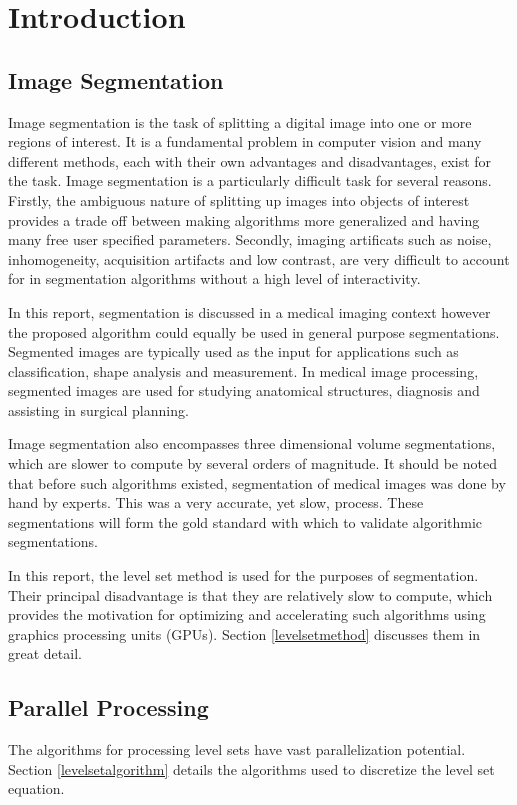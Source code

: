 \chapter{Introduction}

\section{Image Segmentation}
Image segmentation is the task of splitting a digital image into one or more regions of interest. It is a fundamental problem in computer vision and many different methods, each with their own advantages and disadvantages, exist for the task. Image segmentation is a particularly difficult task for several reasons. Firstly, the ambiguous nature of splitting up images into objects of interest provides a trade off between making algorithms more generalized and having many free user specified parameters. Secondly, imaging artificats such as noise, inhomogeneity, acquisition artifacts and low contrast, are very difficult to account for in segmentation algorithms without a high level of interactivity. 

In this report, segmentation is discussed in a medical imaging context however the proposed algorithm could equally be used in general purpose segmentations. Segmented images are typically used as the input for applications such as classification, shape analysis and measurement. In medical image processing, segmented images are used for studying anatomical structures, diagnosis and assisting in surgical planning.

Image segmentation also encompasses three dimensional volume segmentations, which are slower to compute by several orders of magnitude. It should be noted that before such algorithms existed, segmentation of medical images was done by hand by experts. This was a very accurate, yet slow, process. These segmentations will form the gold standard with which to validate algorithmic segmentations.

In this report, the level set method is used for the purposes of segmentation. Their principal disadvantage is that they are relatively slow to compute, which provides the motivation for optimizing and accelerating such algorithms using graphics processing units (GPUs). Section \ref{levelsetmethod} discusses them in great detail.



\section{Parallel Processing}
The algorithms for processing level sets have vast parallelization potential. Section \ref{levelsetalgorithm} details the algorithms used to discretize the level set equation.
